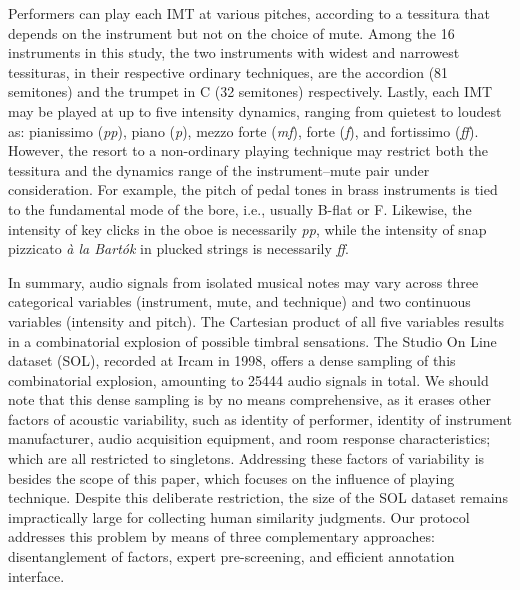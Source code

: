 \documentclass{bmcart}
\makeatletter
\newcommand*{\ie}{i.e.,\@\xspace}
\makeatother
\begin{document}
Performers can play each IMT at various pitches, according to a tessitura that depends on the instrument but not on the choice of mute.
Among the 16 instruments in this study, the two instruments with widest and narrowest tessituras, in their respective ordinary techniques, are the accordion (81 semitones) and the trumpet in C (32 semitones) respectively.
Lastly, each IMT may be played at up to five intensity dynamics, ranging from quietest to loudest as: pianissimo (\emph{pp}), piano (\emph{p}), mezzo forte (\emph{mf}), forte (\emph{f}), and fortissimo (\emph{ff}).
However, the resort to a non-ordinary playing technique may restrict both the tessitura and the dynamics range of the instrument--mute pair under consideration.
For example, the pitch of pedal tones in brass instruments is tied to the fundamental mode of the bore, \ie{} usually B-flat or F. %
Likewise, the intensity of key clicks in the oboe is necessarily \emph{pp}, while the intensity of snap pizzicato \emph{\`a la Bart\'ok} in plucked strings is necessarily \emph{ff}.

In summary, audio signals from isolated musical notes may vary across three categorical variables (instrument, mute, and technique) and two continuous variables (intensity and pitch).
The Cartesian product of all five variables results in a combinatorial explosion of possible timbral sensations.
The Studio On Line dataset (SOL), recorded at Ircam in 1998, offers a dense sampling of this combinatorial explosion, amounting to 25444 audio signals in total.
We should note that this dense sampling is by no means comprehensive, as it erases other factors of acoustic variability, such as identity of performer, identity of instrument manufacturer, audio acquisition equipment, and room response characteristics; which are all restricted to singletons.
Addressing these factors of variability is besides the scope of this paper, which focuses on the influence of playing technique.
Despite this deliberate restriction, the size of the SOL dataset remains impractically large for collecting human similarity judgments.
Our protocol addresses this problem by means of three complementary approaches: disentanglement of factors, expert pre-screening, and efficient annotation interface.
\end{document}
